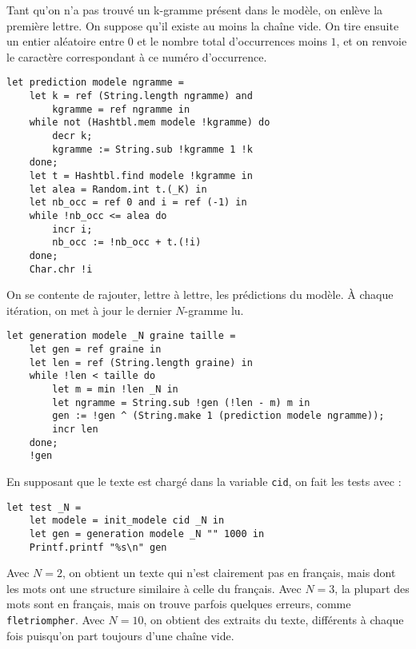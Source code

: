 \documentclass[10pt]{article}
\begin{document}
\begin{Exercise}
Tant qu'on n'a pas trouvé un k-gramme présent dans le modèle, on enlève la première lettre. On suppose qu'il existe au moins la chaîne vide. On tire ensuite un entier aléatoire entre $0$ et le nombre total d'occurrences moins $1$, et on renvoie le caractère correspondant à ce numéro d'occurrence.
\begin{cbox}
   \begin{verbatim}
let prediction modele ngramme =
    let k = ref (String.length ngramme) and
        kgramme = ref ngramme in
    while not (Hashtbl.mem modele !kgramme) do
        decr k;
        kgramme := String.sub !kgramme 1 !k
    done;
    let t = Hashtbl.find modele !kgramme in
    let alea = Random.int t.(_K) in
    let nb_occ = ref 0 and i = ref (-1) in
    while !nb_occ <= alea do
        incr i;
        nb_occ := !nb_occ + t.(!i)
    done;
    Char.chr !i
   \end{verbatim}
\end{cbox}
\end{Exercise}

\begin{Exercise}
On se contente de rajouter, lettre à lettre, les prédictions du modèle. À chaque itération, on met à jour le dernier $N$-gramme lu.
\begin{cbox}
   \begin{verbatim}
let generation modele _N graine taille =
    let gen = ref graine in
    let len = ref (String.length graine) in
    while !len < taille do
        let m = min !len _N in
        let ngramme = String.sub !gen (!len - m) m in
        gen := !gen ^ (String.make 1 (prediction modele ngramme));
        incr len
    done;
    !gen
   \end{verbatim}
\end{cbox}
\end{Exercise}

\begin{Exercise}
En supposant que le texte est chargé dans la variable \verb"cid", on fait les tests avec :
\begin{cbox}
   \begin{verbatim}
let test _N = 
    let modele = init_modele cid _N in
    let gen = generation modele _N "" 1000 in
    Printf.printf "%s\n" gen
   \end{verbatim}
\end{cbox}
Avec $N = 2$, on obtient un texte qui n'est clairement pas en français, mais dont les mots ont une structure similaire à celle du français. Avec $N = 3$, la plupart des mots sont en français, mais on trouve parfois quelques erreurs, comme \verb"fletriompher". Avec $N = 10$, on obtient des extraits du texte, différents à chaque fois puisqu'on part toujours d'une chaîne vide.
\end{Exercise}
\end{document}
